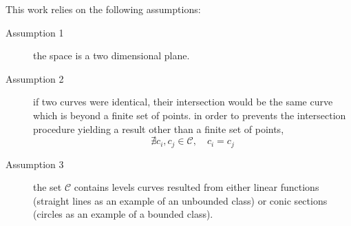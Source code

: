 This work relies on the following assumptions:
\begin{description}
\item [Assumption 1] the space is a two dimensional plane.
\item [Assumption 2] if two curves were identical, their intersection would be the same curve which is beyond a finite set of points.
  in order to prevents the intersection procedure yielding a result other than a finite set of points,
  \[ \nexists c_i , c_j \in \mathcal{C}, \quad c_i = c_j \]
\item [Assumption 3] the set $\mathcal{C}$ contains levels curves resulted from either linear functions (straight lines as an example of an unbounded class) or conic sections (circles as an example of a bounded class).
\end{description}
